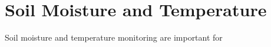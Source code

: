 \chapter{Soil Moisture and Temperature}

Soil moisture and temperature monitoring are important for 
